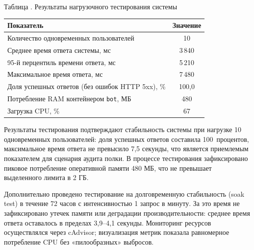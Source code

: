 {	\topTablespace
	{\begin{Center}
		\par \gostFont Таблица \thechaptercntr .\thetablecntr \spc {--} Результаты нагрузочного тестирования системы

		\renewcommand{\arraystretch}{1.4} %
		\begin{tabular}{|l|c|}
			\hline
			Показатель                                      & Значение \\ \hline
			Количество одновременных пользователей          & 10                \\ \hline
			Среднее время ответа системы, мс                & 3\,840            \\ \hline
			95-й перцентиль времени ответа, мс              & 5\,210            \\ \hline
			Максимальное время ответа, мс                   & 7\,480            \\ \hline
			Доля успешных ответов (без ошибок HTTP 5xx), \% & 100,0             \\ \hline
			Потребление RAM контейнером \texttt{bot}, МБ    & 480               \\ \hline
			Загрузка CPU, \%                                & 67                \\ \hline
		\end{tabular}
	\end{Center}}
	\botTablespace \addtocounter{tablecntr}{1}

	\par \redline Результаты тестирования подтверждают стабильность системы при нагрузке 10 одновременных пользователей: доля успешных ответов составила 100~процентов, максимальное время ответа не превысило 7,5 секунды, что является приемлемым показателем для сценария аудита полки.
	В процессе тестирования зафиксировано пиковое потребление оперативной памяти 480 МБ, что не превышает выделенного лимита в 2 ГБ.
	\par \redline Дополнительно проведено тестирование на долговременную стабильность (soak test) в течение 72 часов с интенсивностью 1 запрос в минуту.
	За это время не зафиксировано утечек памяти или деградации производительности: среднее время ответа оставалось в пределах 3,9–4,1 секунды.
	Мониторинг ресурсов осуществлялся через cAdvisor; визуализация метрик показала равномерное потребление CPU без «пилообразных» выбросов.
	\par
}

